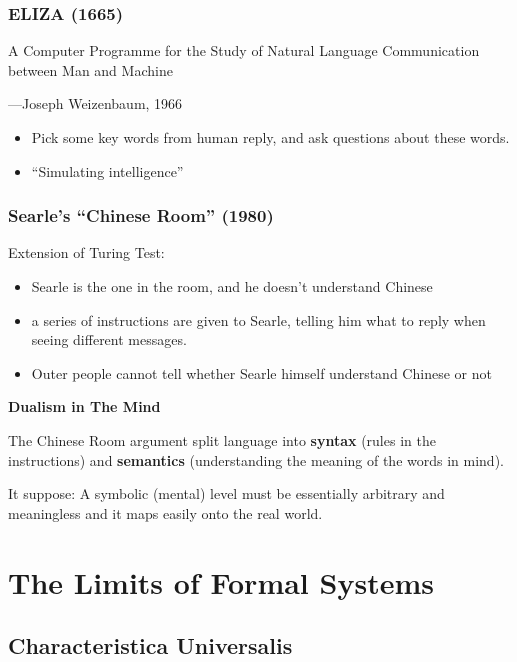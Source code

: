 \documentclass[a4paper, openany]{book}
\begin{document}
\subsubsection{ELIZA (1665)}

A Computer Programme for the Study of Natural Language Communication between Man and Machine

\begin{flushright}
  ---Joseph Weizenbaum, 1966
\end{flushright}

\begin{itemize}
  \item Pick some key words from human reply, and ask questions about these words.
  \item ``Simulating intelligence''
\end{itemize}

\subsubsection{Searle's ``Chinese Room'' (1980)}

Extension of Turing Test:

\begin{itemize}
  \item Searle is the one in the room, and he doesn't understand Chinese
  \item a series of instructions are given to Searle, telling him what to reply when seeing different messages.
  \item Outer people cannot tell whether Searle himself understand  Chinese or not
\end{itemize}

\textbf{Dualism in The Mind}

The Chinese Room argument split language into \textbf{syntax} (rules in the instructions) and \textbf{semantics} (understanding the meaning of the words in mind).

It suppose: A symbolic (mental) level must be essentially arbitrary and meaningless and it maps easily onto the real world.

\section{The Limits of Formal Systems}

\subsection{Characteristica Universalis}
\end{document}
